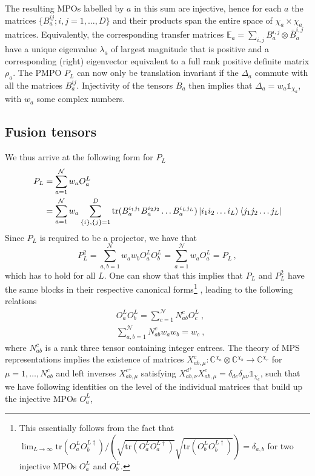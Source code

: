 \documentclass[12 pt]{article}
\begin{document}
The resulting MPOs labelled by $a$ in this sum are injective, hence for each $a$ the matrices $\{B_a^{ij}; i,j=1,\ldots,D\}$ and their products span the entire space of $\chi_a \times \chi_a$ matrices.
Equivalently, the corresponding transfer matrices $\mathbb{E}_{a}=\sum_{i,j} B_{a}^{i,j}\otimes\bar{B}_{a}^{i,j}$ have a unique eigenvalue $\lambda_a$ of largest magnitude that is positive and a corresponding (right) eigenvector equivalent to a full rank positive definite matrix $\rho_a$. The PMPO $P_L$ can now only be translation invariant if the $\Delta_a$ commute with all the matrices $B_a^{ij}$. Injectivity of the tensors $B_a$ then implies that $\Delta_a=w_a \mathds{1}_{\chi_a}$, with $w_a$ some complex numbers.

\subsection{Fusion tensors} \label{subsec:fusiontensors}
We thus arrive at the following form for $P_L$
\begin{equation}
    \begin{split}
        P_L &=  \sum_{a = 1}^{\mathcal{N}}w_a O^L_a\\
            &=   \sum_{a = 1}^{\mathcal{N}}w_a\sum_{\{i\}, \{j\} = 1}^{D} \text{tr}(B_a^{i_1j_1}B_a^{i_2j_2}\dots B_a^{i_Lj_L})
        \ket{i_1 i_2\dots i_L}\bra{j_1 j_2  \dots j_L}
    \end{split}
\end{equation}
Since $P_L$ is required to be a projector, we have that
\begin{equation}
    P_L^2 = \sum_{a, b = 1}^{\mathcal{N}} w_a w_b O^L_a O^L_b =  \sum_{a = 1}^{\mathcal{N}}w_a O^L_a = P_L\, ,
\end{equation}
which has to hold for all $L$. One can show that this implies that $P_L$ and $P_L^2$ have the same blocks in their respective canonical forms\footnote{This essentially follows from the fact that $\lim_{L \rightarrow \infty}\text{tr}(O^L_aO_b^{L\dagger})/\left(\sqrt{\text{tr}(O^L_aO_a^{L\dagger})}\sqrt{\text{tr}(O^L_bO_b^{L\dagger})}\right) = \delta_{a,b}$ for two injective MPOs $O_a^L$ and $O^L_b$.} \cite{PerezGarciaRG}, leading to the following relations
\begin{align}\label{fusioncategory1}
     &O^L_a O^L_b = \sum_{c = 1}^{\mathcal{N}} N_{ab}^c O^L_c\ ,\\
     &\sum_{a,b = 1}^{\mathcal{N}} N_{ab}^c w_a w_b = w_c\ ,
\end{align}
where $N_{ab}^c$ is a rank three tensor containing integer entrees. The theory of MPS representations \cite{MPSrepresentations} implies the existence of matrices $X_{ab,\mu}^c: \mathbb{C}^{\chi_a}\otimes  \mathbb{C}^{\chi_b} \rightarrow  \mathbb{C}^{\chi_c}$ for $\mu=1,\ldots,N_{ab}^{c}$ and left inverses $X_{ab,\mu}^{c^+}$ satisfying $X_{ab,\nu}^{d^+} X_{ab,\mu}^c = \delta_{de}\delta_{\mu\nu}\mathds{1}_{\chi_c}$, such that we have following identities on the level of the individual matrices that build up the injective MPOs $O^L_a$,
\end{document}

